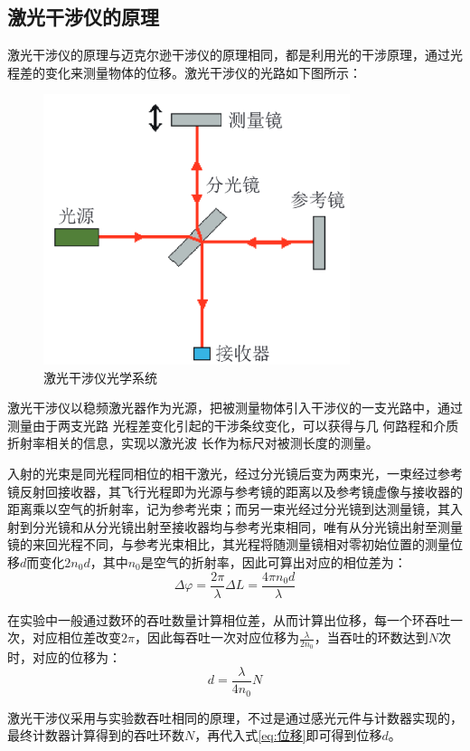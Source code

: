 \documentclass[11pt]{article}
\begin{document}
\subsection{激光干涉仪的原理}
激光干涉仪的原理与迈克尔逊干涉仪的原理相同，都是利用光的干涉原理，通过光程差的变化来测量物体的位移。激光干涉仪的光路如下图所示：
\begin{figure}[H]
  \centering
  \includegraphics[width=0.8\textwidth]{激光干涉仪光学系统.png}
  \caption{激光干涉仪光学系统}
  \label{fig:激光干涉仪光学系统}
\end{figure}
激光干涉仪以稳频激光器作为光源，把被测量物体引入干涉仪的一支光路中，通过测量由于两支光路 光程差变化引起的干涉条纹变化，可以获得与几 何路程和介质折射率相关的信息，实现以激光波 长作为标尺对被测长度的测量\cite{HKJC202301007}。\par
入射的光束是同光程同相位的相干激光，经过分光镜后变为两束光，一束经过参考镜反射回接收器，其飞行光程即为光源与参考镜的距离以及参考镜虚像与接收器的距离乘以空气的折射率，记为参考光束；而另一束光经过分光镜到达测量镜，其入射到分光镜和从分光镜出射至接收器均与参考光束相同，唯有从分光镜出射至测量镜的来回光程不同，与参考光束相比，其光程将随测量镜相对零初始位置的测量位移$d$而变化$2n_0d$，其中$n_0$是空气的折射率，因此可算出对应的相位差为：
\begin{equation}
  \Delta\varphi=\frac{2\pi}{\lambda}\Delta L=\frac{4\pi n_0d}{\lambda}
  \label{eq:相位差}
\end{equation}\par
在实验中一般通过数环的吞吐数量计算相位差，从而计算出位移，每一个环吞吐一次，对应相位差改变$2\pi$，因此每吞吐一次对应位移为$\frac{\lambda}{2n_0}$，当吞吐的环数达到$N$次时，对应的位移为：
\begin{equation}
  d=\frac{\lambda}{4n_0}N
  \label{eq:位移}
\end{equation}\par
激光干涉仪采用与实验数吞吐相同的原理，不过是通过感光元件与计数器实现的，最终计数器计算得到的吞吐环数$N$，再代入式\ref{eq:位移}即可得到位移$d$。\par
\end{document}

